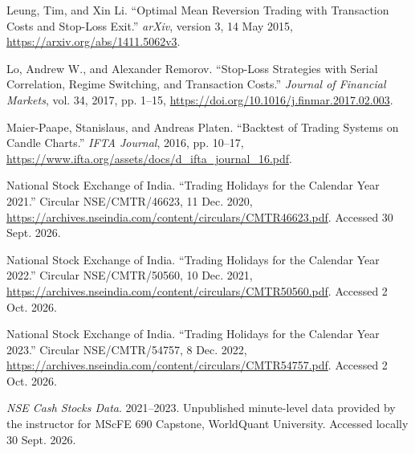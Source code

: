 \documentclass[11pt,a4paper]{article}
\begin{document}
{\RaggedRight\hangindent=1.27cm\noindent Leung, Tim, and Xin Li. “Optimal Mean Reversion Trading with Transaction Costs and Stop-Loss Exit.” \textit{arXiv}, version 3, 14 May 2015, \url{https://arxiv.org/abs/1411.5062v3}.\par}\vspace{5pt}

{\RaggedRight\hangindent=1.27cm\noindent Lo, Andrew W., and Alexander Remorov. “Stop-Loss Strategies with Serial Correlation, Regime Switching, and Transaction Costs.” \textit{Journal of Financial Markets}, vol. 34, 2017, pp. 1--15, \url{https://doi.org/10.1016/j.finmar.2017.02.003}.\par}\vspace{5pt}

{\RaggedRight\hangindent=1.27cm\noindent Maier-Paape, Stanislaus, and Andreas Platen. “Backtest of Trading Systems on Candle Charts.” \textit{IFTA Journal}, 2016, pp. 10--17, \url{https://www.ifta.org/assets/docs/d_ifta_journal_16.pdf}.\par}\vspace{5pt}

{\RaggedRight\hangindent=1.27cm\noindent National Stock Exchange of India. “Trading Holidays for the Calendar Year 2021.” Circular NSE/CMTR/46623, 11 Dec. 2020, \url{https://archives.nseindia.com/content/circulars/CMTR46623.pdf}. Accessed 30 Sept. 2026.\par}\vspace{5pt}

{\RaggedRight\hangindent=1.27cm\noindent National Stock Exchange of India. “Trading Holidays for the Calendar Year 2022.” Circular NSE/CMTR/50560, 10 Dec. 2021, \url{https://archives.nseindia.com/content/circulars/CMTR50560.pdf}. Accessed 2 Oct. 2026.\par}\vspace{5pt}

{\RaggedRight\hangindent=1.27cm\noindent National Stock Exchange of India. “Trading Holidays for the Calendar Year 2023.” Circular NSE/CMTR/54757, 8 Dec. 2022, \url{https://archives.nseindia.com/content/circulars/CMTR54757.pdf}. Accessed 2 Oct. 2026.\par}\vspace{5pt}

{\RaggedRight\hangindent=1.27cm\noindent \textit{NSE Cash Stocks Data}. 2021--2023. Unpublished minute-level data provided by the instructor for MScFE 690 Capstone, WorldQuant University. Accessed locally 30 Sept. 2026.\par}\vspace{5pt}
\end{document}
